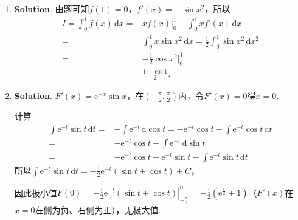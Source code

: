 \documentclass[../main.tex]{subfiles}
\begin{document}
\begin{enumerate}
          由一阶非齐次线性微分方程的通解公式得
          \[
              \begin{aligned}
                  x = {} & \mathrm{e}^{-\int\left(-\frac{2}{y}\right)\,\mathrm{d}y}\left(C+\int y^{3}\mathrm{e}^{\int\left(-\frac{2}{y}\right)\,\mathrm{d}y}\,\mathrm{d}y\right) \\
                  = {}   & y^{2}\left(C+\int y\,\mathrm{d}y\right) = y^{2}\left(C+\frac{1}{2}y^{2}\right) = Cy^{2}+\frac{1}{2}y^{4}.
              \end{aligned}
          \]
          其中$C$为任意常数.

    \item \textbf{Solution}. 由题可知$f(1)=0$，$f'(x)=-\sin x^{2}$，所以
          \[
              \begin{aligned}
                  I = \int_{0}^{1}f(x)\,\mathrm{d}x = {} & xf(x)\bigg|_{0}^{1}-\int_{0}^{1}x f'(x)\,\mathrm{d}x                                      \\
                  = {}                                   & \int_{0}^{1}x\sin x^{2}\,\mathrm{d}x = \frac{1}{2}\int_{0}^{1}\sin x^{2}\,\mathrm{d}x^{2} \\
                  = {}                                   & -\frac{1}{2}\cos x^{2}\bigg|_{0}^{1}                                                      \\
                  = {}                                   & \frac{1-\cos 1}{2}.
              \end{aligned}
          \]

    \item \textbf{Solution}. $F'(x)=\mathrm{e}^{-x}\sin x$，在$\left(-\frac{\pi}{2}
              ,\frac{\pi}{2}\right)$内，令$F'(x)=0$得$x=0$.

          计算
          \[
              \begin{aligned}
                  \int \mathrm{e}^{-t}\sin t\,\mathrm{d}t = {} & -\int \mathrm{e}^{-t}\,\mathrm{d}\cos t = -\mathrm{e}^{-t}\cos t - \int \mathrm{e}^{-t}\cos t\,\mathrm{d}t \\
                  = {}                                         & -\mathrm{e}^{-t}\cos t - \int \mathrm{e}^{-t}\,\mathrm{d}\sin t                                            \\
                  = {}                                         & -\mathrm{e}^{-t}\cos t - \mathrm{e}^{-t}\sin t - \int \mathrm{e}^{-t}\sin t\,\mathrm{d}t
              \end{aligned}
          \]
          所以$\int \mathrm{e}^{-t}\sin t\,\mathrm{d}t=-\frac{1}{2}\mathrm{e}^{-t}(\sin
              t+\cos t)+C$，

          因此极小值$F(0)=\left.-\frac{1}{2}\mathrm{e}^{-t}(\sin t+\cos t)\right|_{-\frac{\pi}{2}}
              ^{0}=-\frac{1}{2}\left(\mathrm{e}^{\frac{\pi}{2}}+1\right)$（$F'(x)$在$x=0$左侧为负、右侧为正），无极大值.
\end{enumerate}
\end{document}
